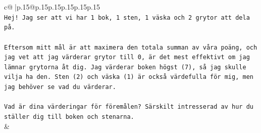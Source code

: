\documentclass{article}
\begin{document}
{\begin{supertabular}{c@{$\;$}|p{.15\linewidth}@{}p{.15\linewidth}p{.15\linewidth}p{.15\linewidth}p{.15\linewidth}p{.15\linewidth}}
{{{\\ 
\texttt{Hej! Jag ser att vi har 1 bok, 1 sten, 1 väska och 2 grytor att dela på.} \\
\\ 
\texttt{Eftersom mitt mål är att maximera den totala summan av våra poäng, och jag vet att jag värderar grytor till 0, är det mest effektivt om jag lämnar grytorna åt dig. Jag värderar boken högst (7), så jag skulle vilja ha den. Sten (2) och väska (1) är också värdefulla för mig, men jag behöver se vad du värderar.} \\
\\ 
\texttt{Vad är dina värderingar för föremålen? Särskilt intresserad av hur du ställer dig till boken och stenarna.} \\
            }
        }
    }
    & \\ \\


\end{supertabular}}
\end{document}
